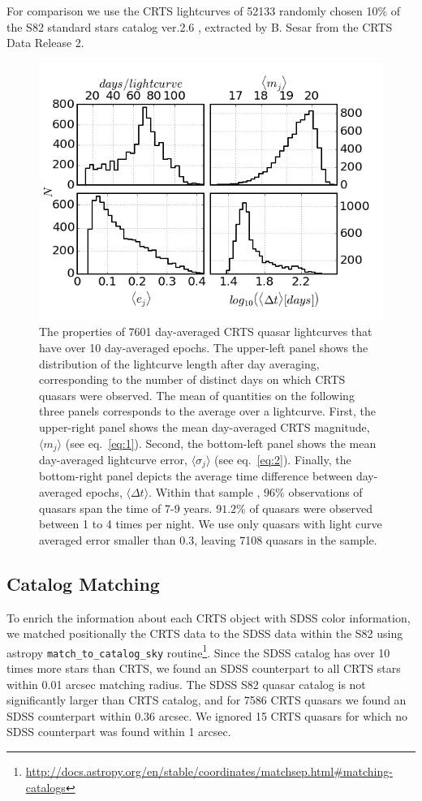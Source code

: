 \documentclass[fleqn,usenatbib]{mnras}  %
\begin{document}
For comparison we use the CRTS lightcurves of 52133 randomly chosen  10\% of the S82 standard stars catalog ver.2.6 \citep{ivezic2007}, extracted by B. Sesar from the CRTS Data Release 2.

\begin{figure}
\label{fig:1}
 \includegraphics[width=1.15\columnwidth]{Fig_1_QSO_CRTS_proc_stats.png}
 \caption{The properties of 7601 day-averaged CRTS quasar lightcurves that have over 10 day-averaged epochs. The upper-left panel shows the distribution of the lightcurve length after day averaging, corresponding to the number of distinct days on which CRTS quasars were observed. The mean of quantities on the following three panels corresponds to the average over a lightcurve. First, the upper-right panel shows the mean day-averaged CRTS magnitude, $\langle  m_{j} \rangle$ (see eq.~\ref{eq:1}). Second, the bottom-left panel shows the  mean day-averaged lightcurve error, $\langle \sigma_{j} \rangle$ (see eq.~\ref{eq:2}). Finally, the bottom-right panel depicts the average time  difference between day-averaged epochs,  $\langle \Delta t \rangle$. Within that sample , $96 \% $ observations of quasars span the time of 7-9 years.  $91.2\%$ of  quasars were observed between 1 to 4 times per night. We use only quasars with light curve averaged error smaller than 0.3, leaving 7108 quasars in the sample.}
\end{figure}



\subsection{Catalog Matching}
To enrich the information about each CRTS object with SDSS color information, we matched positionally the CRTS data to the SDSS data within the S82 using astropy \citep{robitaille2013} \verb|match_to_catalog_sky|  routine\footnote{\url{http://docs.astropy.org/en/stable/coordinates/matchsep.html\#matching-catalogs}}.  
Since the SDSS catalog has over 10 times more stars than CRTS, we found an SDSS counterpart to all  CRTS stars within 0.01 arcsec matching radius. The SDSS S82 quasar catalog is not significantly larger than CRTS catalog, and for 7586 CRTS quasars we found an SDSS counterpart within 0.36 arcsec.   We  ignored  15 CRTS quasars for which no SDSS counterpart was found within 1 arcsec.  
\end{document}

